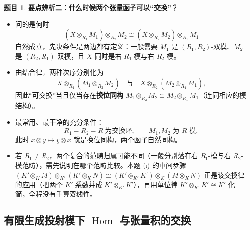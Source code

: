 \documentclass[a4paper]{ctexart}
\theoremstyle{definition}
\newtheorem{example}{题目}[section]
\theoremstyle{analysis}
\theoremstyle{plain}
\begin{document}
\begin{example}
\textbf{要点辨析二：什么时候两个张量函子可以``交换''？}
\begin{itemize}
  \item 问的是何时
  \[
    (X\otimes_{R_1}M_1)\otimes_{R_2}M_2
    \cong
    (X\otimes_{R_2}M_2)\otimes_{R_1}M_1
  \]
  自然成立。先决条件是两边都有定义：一般需要 \(M_1\) 是 \((R_1,R_2)\)-双模、\(M_2\) 是 \((R_2,R_1)\)-双模，且 \(X\) 同时是右 \(R_1\)-模与右 \(R_2\)-模。
  \item 由结合律，两种次序分别化为
  \[
    X\otimes_{R_1}(M_1\otimes_{R_2}M_2)
    \quad\text{与}\quad
    X\otimes_{R_2}(M_2\otimes_{R_1}M_1),
  \]
  因此``可交换''当且仅当存在\textbf{换位同构} \(M_1\otimes_{R_2}M_2\cong M_2\otimes_{R_1}M_1\)（连同相应的模结构）。
  \item 最常用、最干净的充分条件：
  \[
    R_1=R_2=R\text{ 为交换环},\qquad M_1,M_2\text{ 为 }R\text{-模},
  \]
  此时 \(x\otimes y\mapsto y\otimes x\) 就是换位同构，两个函子自然同构。
  \item 若 \(R_1\ne R_2\)，两个复合的范畴归属可能不同（一般分别落在右 \(R_1\)-模与右 \(R_2\)-模范畴），需先说明在哪个范畴比较。本题 (i) 的中间步骤 \((K'\otimes_KM)\otimes_{K'}(K'\otimes_KN)\cong(K'\otimes_{K'}K')\otimes_K(M\otimes_KN)\) 正是该交换律的应用（把两个 \(K'\) 系数并成 \(K'\otimes_{K'}K'\)），再用单位律 \(K'\otimes_{K'}K'\cong K'\) 化简，全程没有手算双线性。
\end{itemize}
\end{example}

\subsection{\texorpdfstring{有限生成投射模下 \(\operatorname{Hom}\) 与张量积的交换}{有限生成投射模下 Hom 与张量积的交换}}\label{subsec:problem-projective-hom-tensor}
\end{document}
